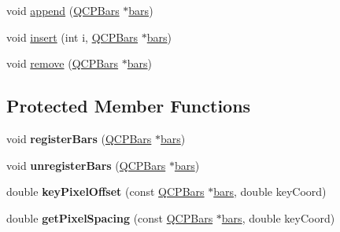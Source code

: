 \begin{DoxyCompactItemize}
void \mbox{\hyperlink{class_q_c_p_bars_group_a809ed63cc4ff7cd5b0b8c96b470163d3}{append}} (\mbox{\hyperlink{class_q_c_p_bars}{Q\+C\+P\+Bars}} $\ast$\mbox{\hyperlink{class_q_c_p_bars_group_a6e4f4e86abbec6a9342f204ef82abef8}{bars}})
\item 
void \mbox{\hyperlink{class_q_c_p_bars_group_a309a5f7233db189f3ea9c2d04ece6c13}{insert}} (int i, \mbox{\hyperlink{class_q_c_p_bars}{Q\+C\+P\+Bars}} $\ast$\mbox{\hyperlink{class_q_c_p_bars_group_a6e4f4e86abbec6a9342f204ef82abef8}{bars}})
\item 
void \mbox{\hyperlink{class_q_c_p_bars_group_a215e28a5944f1159013a0e19169220e7}{remove}} (\mbox{\hyperlink{class_q_c_p_bars}{Q\+C\+P\+Bars}} $\ast$\mbox{\hyperlink{class_q_c_p_bars_group_a6e4f4e86abbec6a9342f204ef82abef8}{bars}})
\end{DoxyCompactItemize}
\subsection*{Protected Member Functions}
\begin{DoxyCompactItemize}
\item 
\mbox{\label{class_q_c_p_bars_group_a7b00514f19ad58d0bb3fd5246a67fae2}} 
void {\bfseries register\+Bars} (\mbox{\hyperlink{class_q_c_p_bars}{Q\+C\+P\+Bars}} $\ast$\mbox{\hyperlink{class_q_c_p_bars_group_a6e4f4e86abbec6a9342f204ef82abef8}{bars}})
\item 
\mbox{\label{class_q_c_p_bars_group_ac7073cdd7b1a40c6cb4b5f908145f8c4}} 
void {\bfseries unregister\+Bars} (\mbox{\hyperlink{class_q_c_p_bars}{Q\+C\+P\+Bars}} $\ast$\mbox{\hyperlink{class_q_c_p_bars_group_a6e4f4e86abbec6a9342f204ef82abef8}{bars}})
\item 
\mbox{\label{class_q_c_p_bars_group_a8e2ca6002e7bab49670144d048a2bcc9}} 
double {\bfseries key\+Pixel\+Offset} (const \mbox{\hyperlink{class_q_c_p_bars}{Q\+C\+P\+Bars}} $\ast$\mbox{\hyperlink{class_q_c_p_bars_group_a6e4f4e86abbec6a9342f204ef82abef8}{bars}}, double key\+Coord)
\item 
\mbox{\label{class_q_c_p_bars_group_a0beccd41bc3841a4c5b284823bc7d2de}} 
double {\bfseries get\+Pixel\+Spacing} (const \mbox{\hyperlink{class_q_c_p_bars}{Q\+C\+P\+Bars}} $\ast$\mbox{\hyperlink{class_q_c_p_bars_group_a6e4f4e86abbec6a9342f204ef82abef8}{bars}}, double key\+Coord)
\end{DoxyCompactItemize}
